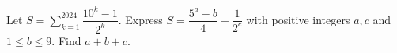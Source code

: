 Let $S=\sum_{k=1}^{2024}\dfrac{10^k-1}{2^k}$. Express $S=\dfrac{5^a-b}{4}+\dfrac{1}{2^c}$ with positive integers $a,c$ and $1\le b\le9$. Find $a+b+c$.
